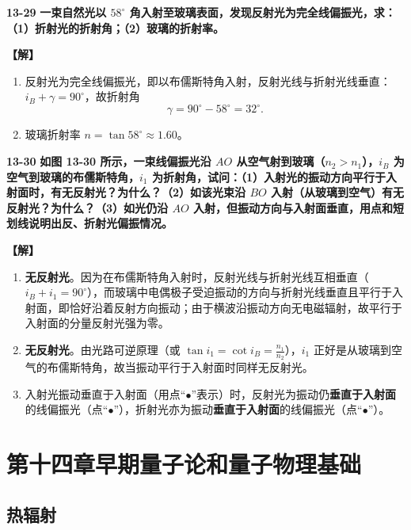 \documentclass[zihao=5,a4paper,UTF8]{ctexart}
\newenvironment{prob}[2]{%
    \par\vspace{6pt}\noindent\textbf{\color{navy}#1} \textbf{#2}\par\nopagebreak\vspace{2pt}%
}{%
    \par\vspace{4pt}%
}
\newcommand{\sol}{\noindent\textbf{\color{tealaccent}【解】}\ }
\begin{document}
\begin{prob}{13-29}{一束自然光以 $58^\circ$ 角入射至玻璃表面，发现反射光为完全线偏振光，求：（1）折射光的折射角；（2）玻璃的折射率。}
\sol
\begin{enumerate}[leftmargin=2em, itemsep=2pt]
    \item 反射光为完全线偏振光，即以布儒斯特角入射，反射光线与折射光线垂直：$i_B + \gamma = 90^\circ$，故折射角
    \[
        \gamma = 90^\circ - 58^\circ = 32^\circ.
    \]
    \item 玻璃折射率 $n = \tan 58^\circ \approx 1.60$。
\end{enumerate}
\end{prob}

\begin{prob}{13-30}{如图 13-30 所示，一束线偏振光沿 $AO$ 从空气射到玻璃（$n_2 > n_1$），$i_B$ 为空气到玻璃的布儒斯特角，$i_1$ 为折射角，试问：（1）入射光的振动方向平行于入射面时，有无反射光？为什么？（2）如该光束沿 $BO$ 入射（从玻璃到空气）有无反射光？为什么？（3）如光仍沿 $AO$ 入射，但振动方向与入射面垂直，用点和短划线说明出反、折射光偏振情况。}
\sol
\begin{enumerate}[leftmargin=2em, itemsep=2pt]
    \item \textbf{无反射光}。因为在布儒斯特角入射时，反射光线与折射光线互相垂直（$i_B + i_1 = 90^\circ$），而玻璃中电偶极子受迫振动的方向与折射光线垂直且平行于入射面，即恰好沿着反射方向振动；由于横波沿振动方向无电磁辐射，故平行于入射面的分量反射光强为零。
    \item \textbf{无反射光}。由光路可逆原理（或 $\tan i_1 = \cot i_B = \frac{n_1}{n_2}$），$i_1$ 正好是从玻璃到空气的布儒斯特角，故当振动平行于入射面时同样无反射光。
    \item 入射光振动垂直于入射面（用点“$\bullet$”表示）时，反射光为振动仍\textbf{垂直于入射面}的线偏振光（点“$\bullet$”），折射光亦为振动\textbf{垂直于入射面}的线偏振光（点“$\bullet$”）。
\end{enumerate}
\end{prob}

\section{第十四章\quad 早期量子论和量子物理基础}

\subsection{热辐射}
\end{document}
